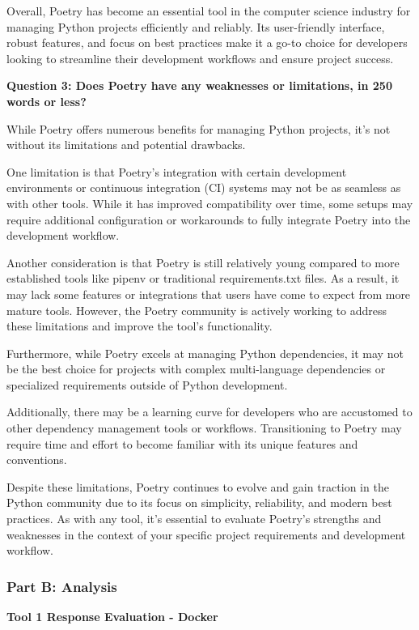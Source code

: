 \documentclass[a4paper, 11pt]{report}
\begin{document}
Overall, Poetry has become an essential tool in the computer science industry for managing Python projects efficiently and reliably. Its user-friendly interface, robust features, and focus on best practices make it a go-to choice for developers looking to streamline their development workflows and ensure project success. 

 \textbf{Question 3: Does Poetry have any weaknesses or limitations, in 250 words or less?}

While Poetry offers numerous benefits for managing Python projects, it's not without its limitations and potential drawbacks. 

One limitation is that Poetry's integration with certain development environments or continuous integration (CI) systems may not be as seamless as with other tools. While it has improved compatibility over time, some setups may require additional configuration or workarounds to fully integrate Poetry into the development workflow. 

Another consideration is that Poetry is still relatively young compared to more established tools like pipenv or traditional requirements.txt files. As a result, it may lack some features or integrations that users have come to expect from more mature tools. However, the Poetry community is actively working to address these limitations and improve the tool's functionality. 

Furthermore, while Poetry excels at managing Python dependencies, it may not be the best choice for projects with complex multi-language dependencies or specialized requirements outside of Python development. 

Additionally, there may be a learning curve for developers who are accustomed to other dependency management tools or workflows. Transitioning to Poetry may require time and effort to become familiar with its unique features and conventions. 

Despite these limitations, Poetry continues to evolve and gain traction in the Python community due to its focus on simplicity, reliability, and modern best practices. As with any tool, it's essential to evaluate Poetry's strengths and weaknesses in the context of your specific project requirements and development workflow. 

\subsubsection{Part B: Analysis}

\textbf{\large{Tool 1 Response Evaluation - Docker}}
\end{document}

